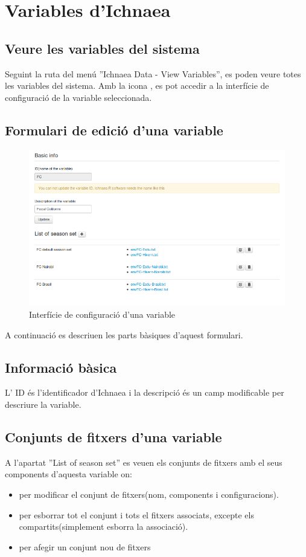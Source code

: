 \section{Variables d'Ichnaea}
\subsection{Veure les variables del sistema}
Seguint la ruta del menú ''Ichnaea  Data - View Variables'', es poden veure totes les variables del sistema. Amb la icona \iconeyeopen, es pot accedir a la interfície de configuraci\'{o} de la variable seleccionada.

\subsection{Formulari de edici\'{o} d'una variable}
\begin{figure}[h!]
  \centering
  \includegraphics[scale=0.5]{img/userguide/variable_configuration.png}
  \caption{Interfície de configuraci\'{o} d'una variable}
  \label{fig:placement}
\end{figure}
A continuació es descriuen les parts bàsiques d'aquest formulari.

\subsection*{Informació bàsica}
L' ID \'{e}s l'identificador d'Ichnaea i la descripció \'{e}s un camp modificable per descriure la variable.

\subsection{Conjunts de fitxers d'una variable}
A l'apartat ''List of season set'' es veuen els conjunts de fitxers amb el seus components d'aquesta variable on:
\begin{itemize}
\item \iconedit per modificar el conjunt de fitxers(nom, components i configuracions).
\item \icontrash per esborrar tot el conjunt i tots el fitxers associats, excepte els compartits(simplement esborra la associació).
\item \iconadd per afegir un conjunt nou de fitxers
\end{itemize}

